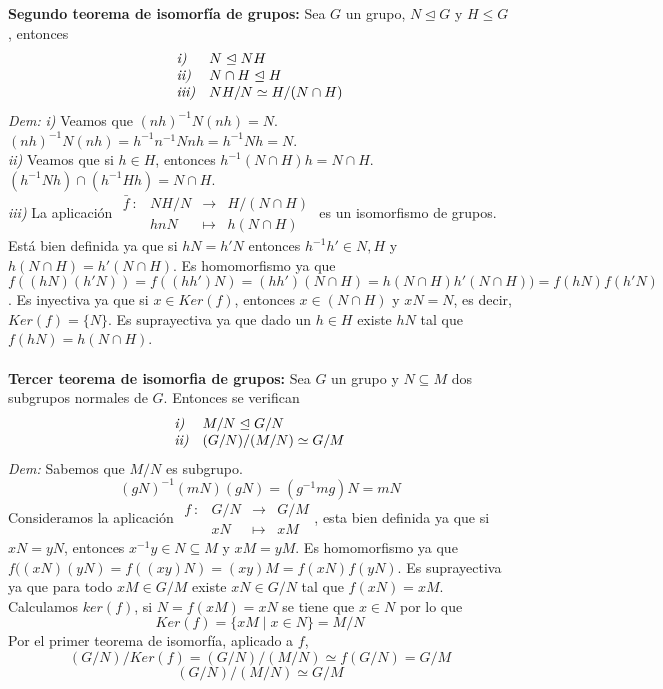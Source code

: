 \documentclass{article}
\begin{document}

\textbf{Segundo teorema de isomorfía de grupos:} Sea $G$ un grupo, $N\trianglelefteq G$ y $H\le G$, entonces
$$
\begin{array}{ll}
    \text{\textit{i)}} & \text{$N\trianglelefteq NH$} \\
    \text{\textit{ii)}} &  \text{$N\cap H \trianglelefteq H$}\\
    \text{\textit{iii)}} & \text{$NH/N\simeq H/(N\cap H)$}
\end{array}
$$
\textit{Dem:} \textit{i)} Veamos que $(nh)^{-1}N(nh)=N$. $(nh)^{-1}N(nh)=h^{-1}n^{-1}Nnh=h^{-1}Nh=N$.\\
\textit{ii)} Veamos que si $h \in H$, entonces $h^{-1}(N\cap H)h=N\cap H$. $(h^{-1}Nh)\cap(h^{-1}Hh)=N\cap H$.\\
\textit{iii)} La aplicación $
\begin{array}{cccc}
    \bar{f}\::&NH/N&\longrightarrow&H/(N\cap H)\\
        &hnN&\longmapsto&h(N\cap H)
\end{array}
$ es un isomorfismo de grupos. Está bien definida ya que si $hN=h'N$ entonces $h^{-1}h'\in N,H$ y $h(N\cap H)=h'(N\cap H)$. Es homomorfismo ya que $f((hN)(h'N))=f((hh')N) = (hh')(N\cap H)=h(N\cap H)h'(N\cap H))=f(hN)f(h'N)$. Es inyectiva ya que si $x\in Ker(f)$, entonces $x\in (N\cap H)$ y $xN=N$, es decir, $Ker(f)=\{N\}$. Es suprayectiva ya que dado un $h\in H$ existe $hN$ tal que $f(hN)=h(N\cap H)$.\\\\


\textbf{Tercer teorema de isomorfia de grupos:} Sea $G$ un grupo y $N\subseteq M$ dos subgrupos normales de $G$. Entonces se verifican
$$
\begin{array}{ll}
    \text{\textit{i)}} & M/N \trianglelefteq G/N \\
    \text{\textit{ii)}} & (G/N)/(M/N)\simeq G/M
\end{array}
$$
\textit{Dem:} Sabemos que $M/N$ es subgrupo.
$$
(gN)^{-1}(mN)(gN)=(g^{-1}mg)N=mN
$$
Consideramos la aplicación $\begin{array}{cccc}
    f\::&G/N&\longrightarrow&G/M\\
        &xN&\longmapsto&xM
\end{array}$, esta bien definida ya que si $xN=yN$, entonces $x^{-1}y\in N\subseteq M$ y $xM=yM$. Es homomorfismo ya que $f((xN)(yN)=f((xy)N)=(xy)M=f(xN)f(yN)$. Es suprayectiva ya que para todo $xM\in G/M$ existe $xN\in G/N$ tal que $f(xN)=xM$. Calculamos $ker(f)$, si $N=f(xM)=xN$ se tiene que $x\in N$ por lo que
$$
Ker(f)=\{xM\mid x\in N\}=M/N
$$
Por el primer teorema de isomorfía, aplicado a $f$,
$$
(G/N)/Ker(f)=(G/N)/(M/N)\simeq f(G/N)=G/M
$$
$$
(G/N)/(M/N)\simeq G/M
$$\\
\end{document}
